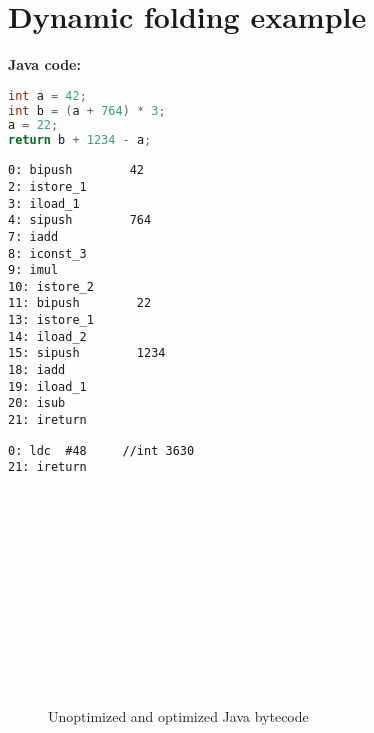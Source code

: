 \section{Dynamic folding example}

\textbf{Java code:}
\begin{lstlisting}[language=Java]
int a = 42;
int b = (a + 764) * 3;
a = 22;
return b + 1234 - a; 
\end{lstlisting}


\newsavebox{\unoptimized}
\begin{lrbox}{\unoptimized}
\begin{lstlisting}[basicstyle=\small]
0: bipush        42
2: istore_1
3: iload_1
4: sipush        764
7: iadd
8: iconst_3
9: imul
10: istore_2
11: bipush        22
13: istore_1
14: iload_2
15: sipush        1234
18: iadd
19: iload_1
20: isub
21: ireturn
\end{lstlisting}
\end{lrbox}

\newsavebox{\optimized}
\begin{lrbox}{\optimized}
\begin{lstlisting}[showlines=true, basicstyle=\small]
0: ldc	#48		//int 3630
21: ireturn














\end{lstlisting}
\end{lrbox}

\begin{figure}[h!]
	\centering
	\subfloat[Unoptimized]{\usebox{\unoptimized}}
	\hspace{0.5cm}\vline\hspace{0.5cm}
	\subfloat[Optimized]{\usebox{\optimized}}
	\caption{Unoptimized and optimized Java bytecode}
\end{figure}